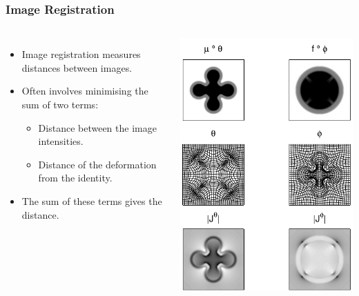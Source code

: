 \begin{frame}
\frametitle{Image Registration}
\begin{columns}[c]
\begin{itemize}
\item Image registration measures distances between images.
\item Often involves minimising the sum of two terms:
\begin{itemize}
\item Distance between the image intensities.
\item Distance of the deformation from the identity.
\end{itemize}
\item The sum of these terms gives the distance.
\end{itemize}
\includegraphics[width=\textwidth]{shoot2d}
\end{columns}
\end{frame}


